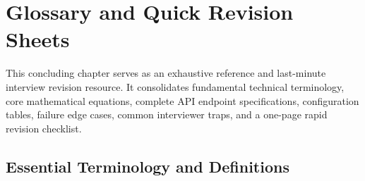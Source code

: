 \chapter{Glossary and Quick Revision Sheets}
\label{ch:glossary_revision}

This concluding chapter serves as an exhaustive reference and last-minute interview revision resource. It consolidates fundamental technical terminology, core mathematical equations, complete API endpoint specifications, configuration tables, failure edge cases, common interviewer traps, and a one-page rapid revision checklist.

\section{Essential Terminology and Definitions}
\label{sec:glossary_terms}

